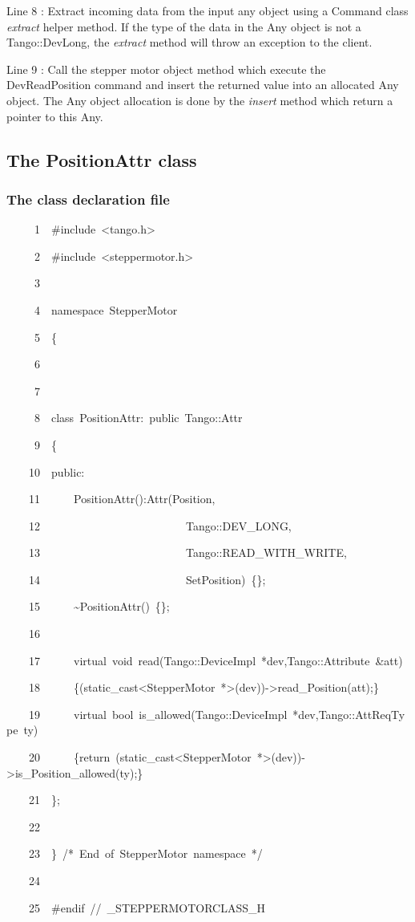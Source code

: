 Line 8 : Extract incoming data from the input any object using a Command
class \emph{extract} helper method. If the type of the data in the
Any object is not a Tango::DevLong, the \emph{extract}
method will throw an exception to the client.

Line 9 : Call the stepper motor object method which execute the DevReadPosition
command and insert the returned value into an allocated Any object.
The Any object allocation is done by the \emph{insert}
method which return a pointer to this Any.

\subsection{The PositionAttr class}

\subsubsection{The class declaration file}


\begin{lyxcode}
~~~~~1~~\#include~<tango.h>

~~~~~2~~\#include~<steppermotor.h>

~~~~~3~~

~~~~~4~~namespace~StepperMotor

~~~~~5~~\{

~~~~~6~~

~~~~~7~~

~~~~~8~~class~PositionAttr:~public~Tango::Attr

~~~~~9~~\{

~~~~10~~public:

~~~~11~~~~~~PositionAttr():Attr(\textquotedbl{}Position\textquotedbl{},

~~~~12~~~~~~~~~~~~~~~~~~~~~~~~~~Tango::DEV\_LONG,

~~~~13~~~~~~~~~~~~~~~~~~~~~~~~~~Tango::READ\_WITH\_WRITE,

~~~~14~~~~~~~~~~~~~~~~~~~~~~~~~~\textquotedbl{}SetPosition\textquotedbl{})~\{\};

~~~~15~~~~~~\textasciitilde{}PositionAttr()~\{\};

~~~~16~~~~~~~~~~

~~~~17~~~~~~virtual~void~read(Tango::DeviceImpl~{*}dev,Tango::Attribute~\&att)

~~~~18~~~~~~\{(static\_cast<StepperMotor~{*}>(dev))->read\_Position(att);\}

~~~~19~~~~~~virtual~bool~is\_allowed(Tango::DeviceImpl~{*}dev,Tango::AttReqType~ty)

~~~~20~~~~~~\{return~(static\_cast<StepperMotor~{*}>(dev))->is\_Position\_allowed(ty);\}

~~~~21~~\};

~~~~22~~

~~~~23~~\}~/{*}~End~of~StepperMotor~namespace~{*}/

~~~~24~~

~~~~25~~\#endif~//~\_STEPPERMOTORCLASS\_H
\end{lyxcode}

